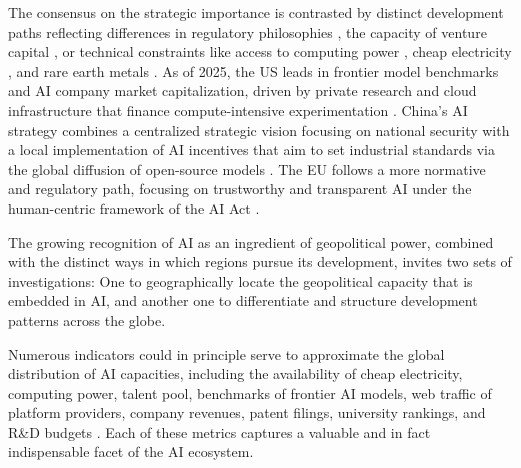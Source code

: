 \documentclass{article}
\begin{document}
	The consensus on the strategic importance is contrasted by distinct development paths reflecting differences in regulatory philosophies \cite{wang2025artificial}, the capacity of venture capital \cite{montanaro2024venture}, or technical constraints like access to computing power \cite{lehdonvirta2025compute}, cheap electricity \cite{lin2024exploding}, and rare earth metals \cite{fan2023geopolitics}.  As of 2025, the US leads in frontier model benchmarks and AI company market capitalization, driven by private research and cloud infrastructure that finance compute-intensive experimentation \cite{sastry2024computing}. China's AI strategy combines a centralized strategic vision focusing on national security with a local implementation of AI incentives that aim to set industrial standards via the global diffusion of open-source models \cite{khanal2024development}. The EU follows a more normative and regulatory path, focusing on trustworthy and transparent AI under the human-centric framework of the AI Act \cite{balcioglu2025turning}.
	
	The growing recognition of AI as an ingredient of geopolitical power, combined with the distinct ways in which regions pursue its development, invites two sets of investigations: One to geographically locate the geopolitical capacity that is embedded in AI, and another one to differentiate and structure development patterns across the globe.
	
	Numerous indicators could in principle serve to approximate the global distribution of AI capacities, including the availability of cheap electricity, computing power, talent pool, benchmarks of frontier AI models, web traffic of platform providers, company revenues, patent filings, university rankings,  and R\&D budgets \cite{ozkaya2023analysis}. Each of these metrics captures a valuable and in fact indispensable facet of the AI ecosystem.
	
\end{document}
